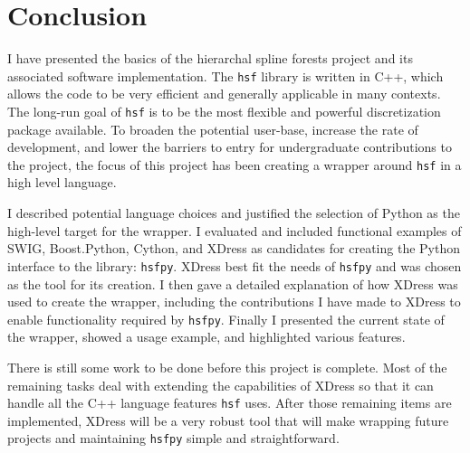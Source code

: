 \section{Conclusion} \label{sec:conclusion}

  I have presented the basics of the hierarchal spline forests project and its associated software implementation. The \texttt{hsf} library is written in C++, which allows the code to be very efficient and generally applicable in many contexts. The long-run goal of \texttt{hsf} is to be the most flexible and powerful discretization package available. To broaden the potential user-base, increase the rate of development, and lower the barriers to entry for undergraduate contributions to the project, the focus of this project has been creating a wrapper around \texttt{hsf} in a high level language.

  I described potential language choices and justified the selection of Python as the high-level target for the wrapper. I evaluated and included functional examples of SWIG, Boost.Python, Cython, and XDress as candidates for creating the Python interface to the library: \texttt{hsfpy}. XDress best fit the needs of \texttt{hsfpy} and was chosen as the tool for its creation. I then gave a detailed explanation of how XDress was used to create the wrapper, including the contributions I have made to XDress to enable functionality required by \texttt{hsfpy}. Finally I presented the current state of the wrapper, showed a usage example, and highlighted various features.

  There is still some work to be done before this project is complete. Most of the remaining tasks deal with extending the capabilities of XDress so that it can handle all the C++ language features \texttt{hsf} uses. After those remaining items are implemented, XDress will be a very robust tool that will make wrapping future projects and maintaining \texttt{hsfpy} simple and straightforward.

